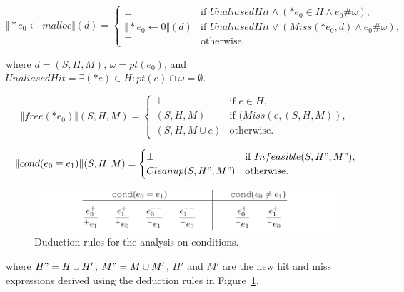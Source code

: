 \[
\Vert *e_0 \gets malloc \Vert(d)=\begin{cases}
\bot& \text{if $UnaliasedHit \wedge (*e_0 \in H \wedge e_0\#\omega)$},\\
\Vert *e_0 \gets 0 \Vert (d)& 
  \text{if $UnaliasedHit \vee (Miss(*e_0,d) \wedge e_0\#\omega)$},\\
\top& \text{otherwise}.
\end{cases}
\]

where $d=(S,H,M)$, $\omega=pt(e_0)$, and 
$UnaliasedHit=\exists(*e)\in H:pt(e)\cap\omega =\emptyset$.


\[
\Vert free(*e_0) \Vert(S,H,M)=\begin{cases}
\bot& \text{if $e \in H$},\\
(S,H,M)& \text{if $(Miss(e,(S,H,M))$},\\
(S,H,M\cup {e})& \text{otherwise}.
\end{cases}
\]


\[
\Vert cond(e_0\equiv e_1)\Vert(S,H,M)=\begin{cases}
\bot& \text{if $Infeasible(S,H",M")$},\\
Cleanup(S,H",M")& \text{otherwise}.
\end{cases}
\]

\begin{figure}
  \centering
  \includegraphics[width=1.0\columnwidth]{figs/rules_cond}
   \caption{Duduction rules for the analysis on conditions.}
   \label{fig:rule_cond}
\end{figure}

where $H"=H\cup H'$, $M"=M\cup M'$, $H'$ and $M'$ are the new hit and miss 
expressions derived using the deduction rules in Figure~\ref{fig:rule_cond}.
